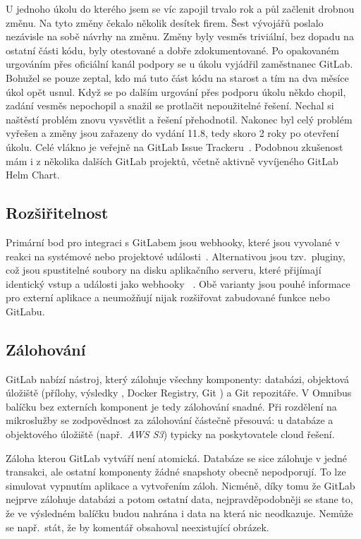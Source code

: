         U jednoho úkolu do kterého jsem se víc zapojil trvalo rok a půl začlenit drobnou změnu. Na tyto změny čekalo několik desítek firem. Šest vývojářů poslalo nezávisle na sobě návrhy na změnu. Změny byly vesměs triviální, bez dopadu na ostatní části kódu, byly otestované a dobře zdokumentované. Po opakovaném urgováním přes oficiální kanál podpory se u úkolu vyjádřil zaměstnanec GitLab. Bohužel se pouze zeptal, kdo má tuto část kódu na starost a tím na dva měsíce úkol opět usnul. Když se po dalším urgování přes podporu úkolu někdo chopil, zadání vesměs nepochopil a snažil se protlačit nepoužitelné řešení. Nechal si naštěstí problém znovu vysvětlit a řešení přehodnotil. Nakonec byl celý problém vyřešen a změny jsou zařazeny do vydání 11.8, tedy skoro 2 roky po otevření úkolu. Celé vlákno je veřejně na GitLab Issue Trackeru~\cite{gitlab-issue-slow}. Podobnou zkušenost mám i z několika dalších GitLab projektů, včetně aktivně vyvíjeného GitLab Helm Chart.

    \subsection{Rozšiřitelnost}
        Primární bod pro integraci s GitLabem jsou webhooky, které jsou vyvolané v reakci na systémové nebo projektové události~\cite{gitlab-webhooks}. Alternativou jsou tzv.~pluginy, což jsou spustitelné soubory na disku aplikačního serveru, které přijímají identický vstup a události jako webhooky ~\cite{gitlab-plugins}. Obě varianty jsou pouhé informace pro externí aplikace a neumožňují nijak rozšiřovat zabudované funkce nebo  GitLabu.

    \subsection{Zálohování}
        GitLab nabízí nástroj, který zálohuje všechny komponenty: databázi, objektová úložiště (přílohy, výsledky \CICD, Docker Registry, Git ) a Git repozitáře. V Omnibus balíčku bez externích komponent je tedy zálohování snadné. Při rozdělení na mikroslužby se zodpovědnost za zálohování částečně přesouvá: u databáze a objektového úložiště (např.~\textit{AWS S3}) typicky na poskytovatele cloud řešení.

        Záloha kterou GitLab vytváří není atomická. Databáze se sice zálohuje v jedné transakci, ale ostatní komponenty žádné snapshoty obecně nepodporují. To lze simulovat vypnutím aplikace a vytvořením záloh. Nicméně, díky tomu že GitLab nejprve zálohuje databázi a potom ostatní data, nejpravděpodobněji se stane to, že ve výsledném balíčku budou nahrána i data na která nic neodkazuje. Nemůže se např.~stát, že by komentář obsahoval neexistující obrázek.

